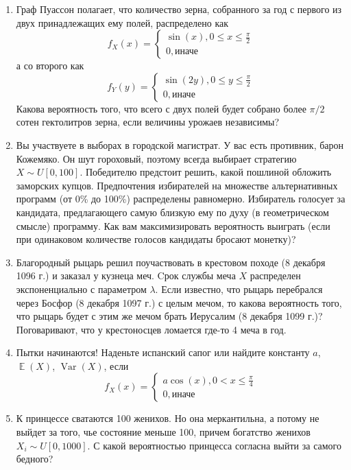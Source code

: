 \documentclass[a4paper,12pt]{article}
\DeclareMathOperator{\Var}{Var}
\DeclareMathOperator{\E}{\mathbb{E}}
\begin{document}
\begin{enumerate} %
\item
Граф Пуассон полагает, что количество зерна, собранного за год с первого из двух принадлежащих ему полей, распределено как
    \[
    f_X(x)=
    \begin{cases}
    \sin(x), 0 \leq x \leq \frac{\pi}{2} \\
    0, \text{иначе}
    \end{cases}\]
   а со второго как
   \[
   f_Y(y)=
   \begin{cases}
   \sin(2y), 0 \leq y \leq \frac{\pi}{2} \\
    0, \text{иначе}
    \end{cases}
    \]
    Какова вероятность того, что всего с двух полей будет собрано более $\pi/2$ сотен гектолитров зерна, если величины урожаев независимы?
\item
Вы участвуете в выборах в городской магистрат. У вас есть противник, барон Кожемяко. Он шут гороховый, поэтому всегда выбирает стратегию $X \sim U[0,100] $. Победителю предстоит решить, какой пошлиной обложить заморских купцов. Предпочтения избирателей на множестве альтернативных программ (от 0\% до 100\%) распределены равномерно. Избиратель голосует за кандидата, предлагающего самую близкую ему по духу (в геометрическом смысле) программу. Как вам максимизировать вероятность выиграть (если при одинаковом количестве голосов кандидаты бросают монетку)?
\item
Благородный рыцарь решил поучаствовать в крестовом походе (8 декабря 1096 г.) и заказал у кузнеца меч. Cрок службы меча $X$ распределен экспоненциально с параметром $\lambda$. Если известно, что рыцарь перебрался через Босфор (8 декабря 1097 г.) с целым мечом, то какова вероятность того, что рыцарь будет с этим же мечом брать Иерусалим (8 декабря 1099 г.)? Поговаривают, что у крестоносцев ломается где-то 4 меча в год.
\item
Пытки начинаются! Наденьте испанский сапог или найдите константу $a$, $\E(X)$, $\Var(X)$, если
    \[
    f_X(x)=
    \begin{cases}
    a\cos(x), 0 < x \leq \frac{\pi}{4} \\
    0, \text{иначе}
    \end{cases}
    \]
\item
К принцессе сватаются 100 женихов. Но она меркантильна, а потому не выйдет за того, чье состояние меньше 100, причем богатство женихов $X_i \sim U[0,1000]$. С какой вероятностью принцесса согласна выйти за самого бедного?
\end{enumerate}
\end{document}
